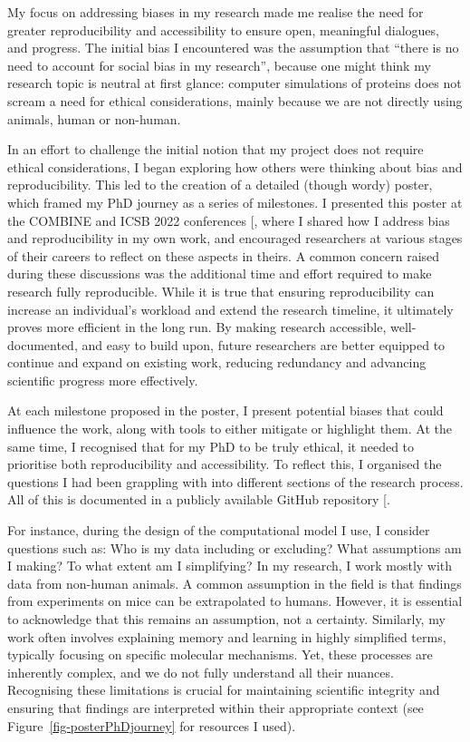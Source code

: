 \documentclass[
  11pt,
  letterpaper,
]{scrreprt}
\begin{document}
My focus on addressing biases in my research made me realise the need
for greater reproducibility and accessibility to ensure open, meaningful
dialogues, and progress. The initial bias I encountered was the
assumption that ``there is no need to account for social bias in my
research'', because one might think my research topic is neutral at
first glance: computer simulations of proteins does not scream a need
for ethical considerations, mainly because we are not directly using
animals, human or non-human.

In an effort to challenge the initial notion that my project does not
require ethical considerations, I began exploring how others were
thinking about bias and reproducibility. This led to the creation of a
detailed (though wordy) poster, which framed my PhD journey as a series
of milestones. I presented this poster at the COMBINE and ICSB 2022
conferences {[}\citeproc{ref-romangarcia2022Biasa}{424}{]}, where I
shared how I address bias and reproducibility in my own work, and
encouraged researchers at various stages of their careers to reflect on
these aspects in theirs. A common concern raised during these
discussions was the additional time and effort required to make research
fully reproducible. While it is true that ensuring reproducibility can
increase an individual's workload and extend the research timeline, it
ultimately proves more efficient in the long run. By making research
accessible, well-documented, and easy to build upon, future researchers
are better equipped to continue and expand on existing work, reducing
redundancy and advancing scientific progress more effectively.

At each milestone proposed in the poster, I present potential biases
that could influence the work, along with tools to either mitigate or
highlight them. At the same time, I recognised that for my PhD to be
truly ethical, it needed to prioritise both reproducibility and
accessibility. To reflect this, I organised the questions I had been
grappling with into different sections of the research process. All of
this is documented in a publicly available GitHub repository
{[}\citeproc{ref-romangarcia2022Biasa}{424}{]}.

For instance, during the design of the computational model I use, I
consider questions such as: Who is my data including or excluding? What
assumptions am I making? To what extent am I simplifying? In my
research, I work mostly with data from non-human animals. A common
assumption in the field is that findings from experiments on mice can be
extrapolated to humans. However, it is essential to acknowledge that
this remains an assumption, not a certainty. Similarly, my work often
involves explaining memory and learning in highly simplified terms,
typically focusing on specific molecular mechanisms. Yet, these
processes are inherently complex, and we do not fully understand all
their nuances. Recognising these limitations is crucial for maintaining
scientific integrity and ensuring that findings are interpreted within
their appropriate context (see Figure~\ref{fig-posterPhDjourney} for
resources I used).
\end{document}
